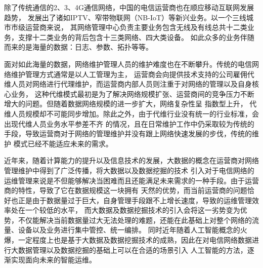 \documentclass{HustGraduPaper}
\begin{document}
    除了传统通信的2、3、4G通信网络，中国的电信运营商也在顺应移动互联网发展趋势，
    发展出了诸如IPTV、窄带物联网（NB-IoT）等新兴业务。以一个三线城市市级运营商来说，
    其网络管理中心负责主要业务包含无线及有线总共十二类业务，支撑十二类业务的背后包含十三类网络、四大类设备。
    如此众多的业务伴随而来的是海量的数据：日志、参数、拓扑等等。

    面对如此海量的数据，网络维护管理人员的维护难度也在不断攀升。传统的电信网络维护管理方式通常是以人工管理为主，
    运营商会向提供技术支持的公司雇佣代维人员对网络进行代理维护，而运营商内部人员则注重于对网络的管理以及自身核心业务，
    这种代维模式最初是为了解决网络规模扩张、运营商间的竞争压力不断增大的问题。但随着数据网络规模的进一步扩大，网络复杂性呈
    指数型上升，   代维人员规模却不可能同步增加。除此之外，由于代维行业没有统一的行业标准，会出现代维人员业务水平参差不齐
    的情况，且在日常维护工作中仍采取较为传统的手段，导致运营商对于网络的管理维护并没有跟上网络快速发展的步伐，传统的维护
    模式已经不能适应未来的需求。

    近年来，随着计算能力的提升以及信息技术的发展，大数据的概念在运营商对网络管理维护中得到了广泛传播，将大数据以及数据挖掘的技术
    引入对于电信网络的运维管理来说是不但能够解决当困难而且还能满足未来需求的一种手段。由于运营商的特性，导致了它在数据规模这一块拥有
    天然的优势，而当前运营商的问题恰好也正是由于数据量过于巨大，自身管理手段跟不上增长速度，导致的运维管理效率处在一个较低的水平，
    而大数据及数据挖掘技术的引入会将这一劣势变为优势，不仅能解决当前数据量过大无法处理的难题，还能在此基础上对整个网络的流量、设备以及业务进行集中管控、统一编排。
    同时近年随着人工智能概念的火爆，一定程度上也是基于大数据及数据挖掘技术的成熟，因此在对电信网络数据进行大数据管理以及数据挖掘的基础上可以在合适的场景引入
    人工智能的方法，逐渐实现面向未来的智能运维。
    
\end{document}
